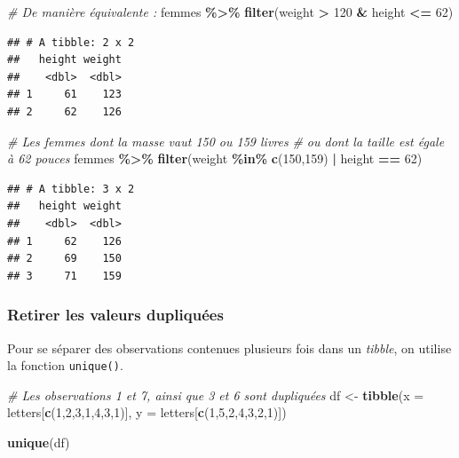 \documentclass[
  11pt,
]{book}
\newenvironment{Shaded}{\begin{snugshade}}{\end{snugshade}}
\newcommand{\CommentTok}[1]{\textcolor[rgb]{0.56,0.35,0.01}{\textit{#1}}}
\newcommand{\DataTypeTok}[1]{\textcolor[rgb]{0.13,0.29,0.53}{#1}}
\newcommand{\DecValTok}[1]{\textcolor[rgb]{0.00,0.00,0.81}{#1}}
\newcommand{\KeywordTok}[1]{\textcolor[rgb]{0.13,0.29,0.53}{\textbf{#1}}}
\newcommand{\NormalTok}[1]{#1}
\newcommand{\OperatorTok}[1]{\textcolor[rgb]{0.81,0.36,0.00}{\textbf{#1}}}
\newcommand{\StringTok}[1]{\textcolor[rgb]{0.31,0.60,0.02}{#1}}
\numberwithin{equation}{section}
\numberwithin{countremarque}{section}
\begin{document}
\begin{Shaded}
\begin{Highlighting}[]
\CommentTok{\# De manière équivalente :}
\NormalTok{femmes }\OperatorTok{\%\textgreater{}\%}\StringTok{ }
\StringTok{  }\KeywordTok{filter}\NormalTok{(weight }\OperatorTok{\textgreater{}}\StringTok{ }\DecValTok{120} \OperatorTok{\&}\StringTok{ }\NormalTok{height }\OperatorTok{\textless{}=}\StringTok{ }\DecValTok{62}\NormalTok{)}
\end{Highlighting}
\end{Shaded}

\begin{lstlisting}
## # A tibble: 2 x 2
##   height weight
##    <dbl>  <dbl>
## 1     61    123
## 2     62    126
\end{lstlisting}

\begin{Shaded}
\begin{Highlighting}[]
\CommentTok{\# Les femmes dont la masse vaut 150 ou 159 livres}
\CommentTok{\# ou dont la taille est égale à 62 pouces}
\NormalTok{femmes }\OperatorTok{\%\textgreater{}\%}\StringTok{ }
\StringTok{  }\KeywordTok{filter}\NormalTok{(weight }\OperatorTok{\%in\%}\StringTok{ }\KeywordTok{c}\NormalTok{(}\DecValTok{150}\NormalTok{,}\DecValTok{159}\NormalTok{) }\OperatorTok{|}\StringTok{ }\NormalTok{height }\OperatorTok{==}\StringTok{ }\DecValTok{62}\NormalTok{)}
\end{Highlighting}
\end{Shaded}

\begin{lstlisting}
## # A tibble: 3 x 2
##   height weight
##    <dbl>  <dbl>
## 1     62    126
## 2     69    150
## 3     71    159
\end{lstlisting}

\hypertarget{retirer-les-valeurs-dupliquuxe9es}{%
\subsubsection{Retirer les valeurs dupliquées}\label{retirer-les-valeurs-dupliquuxe9es}}

Pour se séparer des observations contenues plusieurs fois dans un \emph{tibble}, on utilise la fonction \texttt{unique()}.

\begin{Shaded}
\begin{Highlighting}[]
\CommentTok{\# Les observations 1 et 7, ainsi que 3 et 6 sont dupliquées}
\NormalTok{df \textless{}{-}}\StringTok{ }\KeywordTok{tibble}\NormalTok{(}\DataTypeTok{x =}\NormalTok{ letters[}\KeywordTok{c}\NormalTok{(}\DecValTok{1}\NormalTok{,}\DecValTok{2}\NormalTok{,}\DecValTok{3}\NormalTok{,}\DecValTok{1}\NormalTok{,}\DecValTok{4}\NormalTok{,}\DecValTok{3}\NormalTok{,}\DecValTok{1}\NormalTok{)],}
                 \DataTypeTok{y =}\NormalTok{ letters[}\KeywordTok{c}\NormalTok{(}\DecValTok{1}\NormalTok{,}\DecValTok{5}\NormalTok{,}\DecValTok{2}\NormalTok{,}\DecValTok{4}\NormalTok{,}\DecValTok{3}\NormalTok{,}\DecValTok{2}\NormalTok{,}\DecValTok{1}\NormalTok{)])}

\KeywordTok{unique}\NormalTok{(df)}
\end{Highlighting}
\end{Shaded}
\end{document}
